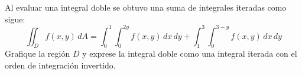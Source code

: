 \item Al evaluar una integral doble se obtuvo una suma de integrales iteradas como sigue:
\[ \iint_D f(x, y) \, dA = \int_0^1 \int_0^{2y} f(x, y) \, dx \, dy + \int_1^3 \int_0^{3-y} f(x, y) \, dx \, dy \]
Grafique la región $D$ y exprese la integral doble como una integral iterada con el orden de integración invertido.
